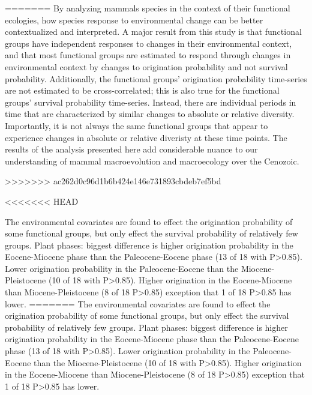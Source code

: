 \documentclass[12pt,letterpaper]{article}
\begin{document}
=======
By analyzing mammals species in the context of their functional ecologies, how species response to environmental change can be better contextualized and interpreted. A major result from this study is that functional groups have independent responses to changes in their environmental context, and that most functional groups are estimated to respond through changes in environmental context by changes to origination probability and not survival probability. Additionally, the functional groups' origination probability time-series are not estimated to be cross-correlated; this is also true for the functional groups' survival probability time-series. Instead, there are individual periods in time that are characterized by similar changes to absolute or relative diversity. Importantly, it is not always the same functional groups that appear to experience changes in absolute or relative diveristy at these time points. The results of the analysis presented here add considerable nuance to our understanding of mammal macroevolution and macroecology over the Cenozoic. 

>>>>>>> ac262d0c96d1b6b424e146e731893cbdeb7ef5bd


<<<<<<< HEAD

The environmental covariates are found to effect the origination probability of some functional groups, but only effect the survival probability of relatively few groups. Plant phases: biggest difference is higher origination probability in the Eocene-Miocene phase than the Paleocene-Eocene phase (13 of 18 with P>0.85). Lower origination probability in the Paleocene-Eocene than the Miocene-Pleistocene (10 of 18 with P>0.85). Higher origination in the Eocene-Miocene than Miocene-Pleistocene (8 of 18 P>0.85) exception that 1 of 18 P>0.85 has lower.
=======
The environmental covariates are found to effect the origination probability of some functional groups, but only effect the survival probability of relatively few groups. Plant phases: biggest difference is higher origination probability in the Eocene-Miocene phase than the Paleocene-Eocene phase (13 of 18 with P>0.85). Lower origination probability in the Paleocene-Eocene than the Miocene-Pleistocene (10 of 18 with P>0.85). Higher origination in the Eocene-Miocene than Miocene-Pleistocene (8 of 18 P>0.85) exception that 1 of 18 P>0.85 has lower.
\end{document}
